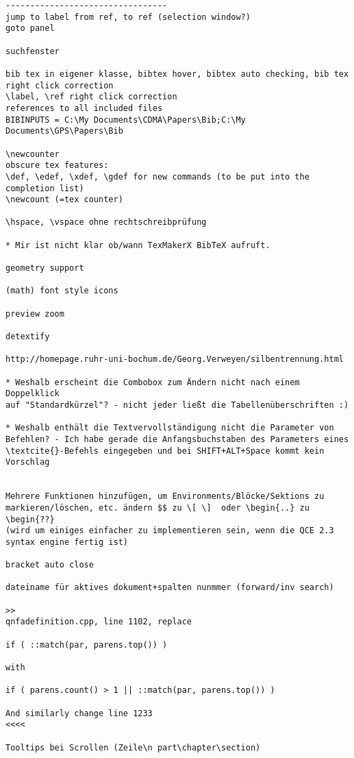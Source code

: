 \documentclass[10pt,a4paper,landscape]{report}
\begin{document}
\begin{verbatim}
---------------------------------
jump to label from ref, to ref (selection window?)
goto panel

suchfenster

bib tex in eigener klasse, bibtex hover, bibtex auto checking, bib tex right click correction
\label, \ref right click correction
references to all included files
BIBINPUTS = C:\My Documents\CDMA\Papers\Bib;C:\My Documents\GPS\Papers\Bib

\newcounter
obscure tex features:
\def, \edef, \xdef, \gdef for new commands (to be put into the completion list)
\newcount (=tex counter)

\hspace, \vspace ohne rechtschreibprüfung

* Mir ist nicht klar ob/wann TexMakerX BibTeX aufruft. 

geometry support

(math) font style icons

preview zoom

detextify

http://homepage.ruhr-uni-bochum.de/Georg.Verweyen/silbentrennung.html

* Weshalb erscheint die Combobox zum Ändern nicht nach einem Doppelklick
auf "Standardkürzel"? - nicht jeder ließt die Tabellenüberschriften :)

* Weshalb enthält die Textvervollständigung nicht die Parameter von
Befehlen? - Ich habe gerade die Anfangsbuchstaben des Parameters eines
\textcite{}-Befehls eingegeben und bei SHIFT+ALT+Space kommt kein Vorschlag


Mehrere Funktionen hinzufügen, um Environments/Blöcke/Sektions zu markieren/löschen, etc. ändern $$ zu \[ \]  oder \begin{..} zu \begin{??} 
(wird um einiges einfacher zu implementieren sein, wenn die QCE 2.3 syntax engine fertig ist)

bracket auto close

dateiname für aktives dokument+spalten nunmmer (forward/inv search)

>>
qnfadefinition.cpp, line 1102, replace

if ( ::match(par, parens.top()) )

with

if ( parens.count() > 1 || ::match(par, parens.top()) )

And similarly change line 1233
<<<<

Tooltips bei Scrollen (Zeile\n part\chapter\section)


\end{verbatim}
\end{document}
